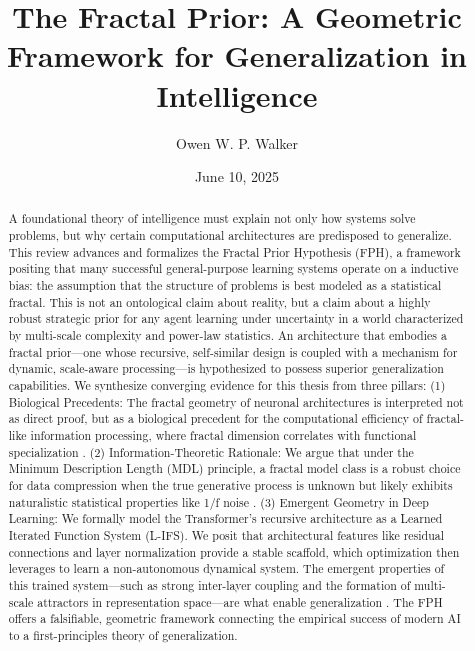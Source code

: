 \documentclass[11pt,a4paper]{article}
\title{\textbf{The Fractal Prior: A Geometric Framework for Generalization in Intelligence}}
\author[1]{Owen W. P. Walker}
\affil[1]{Independent Researcher\ \href{mailto:walk9312@mylaurier.ca}{walk9312@mylaurier.ca}}
\date{June 10, 2025}
\begin{document}
\maketitle

\begin{abstract}
\noindent A foundational theory of intelligence must explain not only how systems solve problems, but why certain computational architectures are predisposed to generalize. This review advances and formalizes the Fractal Prior Hypothesis (FPH), a framework positing that many successful general-purpose learning systems operate on a  inductive bias: the assumption that the structure of problems is best modeled as a statistical fractal. This is not an ontological claim about reality, but a claim about a highly robust strategic prior for any agent learning under uncertainty in a world characterized by multi-scale complexity and power-law statistics. An architecture that embodies a fractal prior—one whose recursive, self-similar design is coupled with a mechanism for dynamic, scale-aware processing—is hypothesized to possess superior generalization capabilities. We synthesize converging evidence for this thesis from three pillars: (1) Biological Precedents: The fractal geometry of neuronal architectures is interpreted not as direct proof, but as a biological precedent for the computational efficiency of fractal-like information processing, where fractal dimension correlates with functional specialization \cite{grosu2023fractal, smith2021neurons}. (2) Information-Theoretic Rationale: We argue that under the Minimum Description Length (MDL) principle, a fractal model class is a robust choice for data compression when the true generative process is unknown but likely exhibits naturalistic statistical properties like 1/f noise \cite{li2009kolmogorov, gershenson2025self}. (3) Emergent Geometry in Deep Learning: We formally model the Transformer's recursive architecture as a Learned Iterated Function System (L-IFS). We posit that architectural features like residual connections and layer normalization provide a stable scaffold, which optimization then leverages to learn a non-autonomous dynamical system. The emergent properties of this trained system—such as strong inter-layer coupling and the formation of multi-scale attractors in representation space—are what enable  generalization \cite{noci2024transformer}. The FPH offers a falsifiable, geometric framework connecting the empirical success of modern AI to a first-principles theory of generalization.
\end{abstract}
\end{document}

